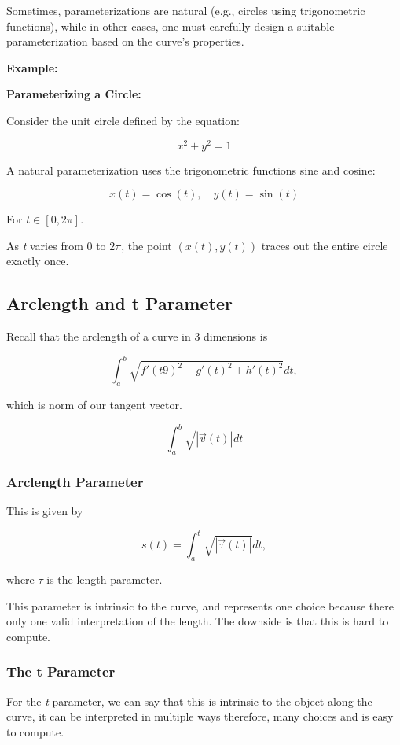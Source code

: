 Sometimes, parameterizations are natural (e.g., circles using trigonometric functions), while in other 
cases, one must carefully design a suitable parameterization based on the curve's properties.
\vspace{\baselineskip}

\textbf{Example:}
\vspace{\baselineskip}

\textbf{Parameterizing a Circle:}  

Consider the unit circle defined by the equation:

\[
    x^2 + y^2 = 1
\]

A natural parameterization uses the trigonometric functions sine and cosine:

\[
    x(t) = \cos(t), \quad y(t) = \sin(t)
\]

For \( t \in [0, 2\pi] \).  

As \emph{t} varies from \( 0 \) to \( 2\pi \), the point \( (x(t), y(t)) \) traces out the entire circle 
exactly once.

\subsection{Arclength and t Parameter}

Recall that the arclength of a curve in 3 dimensions is

\[
    \int_{a}^{b} \sqrt{{f'(t9)}^2 + {g'(t)}^2 + {h'(t)}^2} dt,
\]

which is norm of our tangent vector.

\[
    \int_{a}^{b} \sqrt{|\vec{v}(t)|} dt
\]

\subsubsection{Arclength Parameter}

This is given by

\[
    s(t) = \int_{a}^{t} \sqrt{|\vec{\tau}(t)|} dt,
\]

where \(\tau\) is the length parameter.
\vspace{\baselineskip}

This parameter is intrinsic to the curve, and represents one choice because there only one valid
interpretation of the length. The downside is that this is hard to compute.

\subsubsection{The t Parameter}

For the \emph{t} parameter, we can say that this is intrinsic to the object along the curve,
it can be interpreted in multiple ways therefore, many choices and is easy to compute. 

